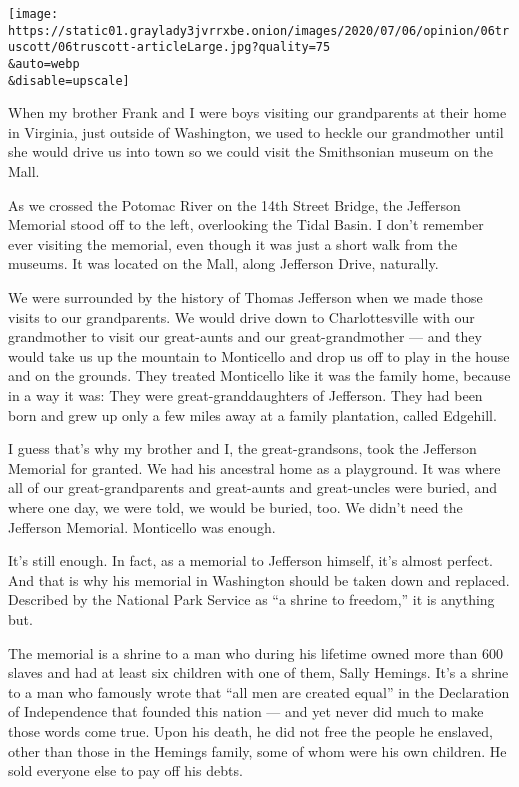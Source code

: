 \texttt{[image: https://static01.graylady3jvrrxbe.onion/images/2020/07/06/opinion/06truscott/06truscott-articleLarge.jpg?quality=75\\\&auto=webp\\\&disable=upscale]}

When my brother Frank and I were boys visiting our grandparents at their
home in Virginia, just outside of Washington, we used to heckle our
grandmother until she would drive us into town so we could visit the
Smithsonian museum on the Mall.

As we crossed the Potomac River on the 14th Street Bridge, the Jefferson
Memorial stood off to the left, overlooking the Tidal Basin. I don't
remember ever visiting the memorial, even though it was just a short
walk from the museums. It was located on the Mall, along Jefferson
Drive, naturally.

We were surrounded by the history of Thomas Jefferson when we made those
visits to our grandparents. We would drive down to Charlottesville with
our grandmother to visit our great-aunts and our great-grandmother ---
and they would take us up the mountain to Monticello and drop us off to
play in the house and on the grounds. They treated Monticello like it
was the family home, because in a way it was: They were
great-granddaughters of Jefferson. They had been born and grew up only a
few miles away at a family plantation, called Edgehill.

I guess that's why my brother and I, the great-grandsons, took the
Jefferson Memorial for granted. We had his ancestral home as a
playground. It was where all of our great-grandparents and great-aunts
and great-uncles were buried, and where one day, we were told, we would
be buried, too. We didn't need the Jefferson Memorial. Monticello was
enough.

It's still enough. In fact, as a memorial to Jefferson himself, it's
almost perfect. And that is why his memorial in Washington should be
taken down and replaced. Described by the National Park Service as ``a
shrine to freedom,'' it is anything but.

The memorial is a shrine to a man who during his lifetime owned more
than 600 slaves and had at least six children with one of them, Sally
Hemings. It's a shrine to a man who famously wrote that ``all men are
created equal'' in the Declaration of Independence that founded this
nation --- and yet never did much to make those words come true. Upon
his death, he did not free the people he enslaved, other than those in
the Hemings family, some of whom were his own children. He sold everyone
else to pay off his debts.

